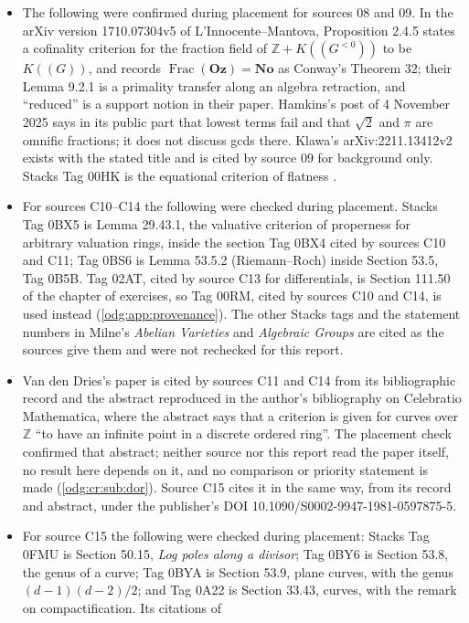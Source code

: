 \documentclass[11pt,oneside]{article}
\numberwithin{equation}{section}
\theoremstyle{definition}
\theoremstyle{remark}
\newcommand{\No}{\mathbf{No}}
\newcommand{\Oz}{\mathbf{Oz}}
\newcommand{\Z}{\mathbb Z}
\newcommand{\Frac}{\operatorname{Frac}}
\begin{document}
\begin{itemize}[leftmargin=*]
\item The following were confirmed during placement for sources 08 and 09. In
the arXiv version 1710.07304v5 of L'Innocente--Mantova, Proposition 2.4.5
states a
cofinality criterion for the fraction field of $\Z+K((G^{<0}))$ to be
$K((G))$, and records $\Frac(\Oz)=\No$ as Conway's Theorem 32; their Lemma
9.2.1 is a primality
transfer along an algebra retraction, and ``reduced'' is a support notion in
their paper. Hamkins's post of 4 November 2025 \cite{Hamkins} says in its
public part that lowest terms fail and that $\sqrt2$ and $\pi$ are omnific
fractions; it does not discuss gcds there. Klawa's arXiv:2211.13412v2
\cite{Klawa} exists with the stated title and is cited by source 09 for
background only. Stacks Tag 00HK is the equational criterion of flatness
\cite{StacksFlat}.
\item For sources C10--C14 the following were checked during placement. Stacks Tag
0BX5 is Lemma 29.43.1, the valuative criterion of properness for arbitrary valuation
rings, inside the section Tag 0BX4 cited by sources C10 and C11; Tag 0BS6 is Lemma
53.5.2 (Riemann--Roch) inside Section 53.5, Tag 0B5B. Tag 02AT, cited by source C13
for differentials, is Section 111.50 of the chapter of exercises, so Tag 00RM,
cited by sources C10 and C14, is used instead (\cref{odg:app:provenance}). The other
Stacks tags and the statement numbers in Milne's \emph{Abelian Varieties} and
\emph{Algebraic Groups} are cited as the sources give them and were not rechecked for
this report.
\item Van den Dries's paper \cite{vdDries} is cited by sources C11 and C14 from its
bibliographic record and the abstract reproduced in the author's bibliography on
Celebratio Mathematica, where the abstract says that a criterion is given for curves
over $\Z$ ``to have an infinite point in a discrete ordered ring''. The placement check
confirmed that abstract; neither source nor this report read the paper itself, no
result here depends on it, and no comparison or priority statement is made
(\cref{odg:cr:sub:dor}). Source C15 cites it in the same way, from its record and
abstract, under the publisher's DOI 10.1090/S0002-9947-1981-0597875-5.
\item For source C15 the following were checked during placement: Stacks Tag 0FMU is
Section 50.15, \emph{Log poles along a divisor}; Tag 0BY6 is Section 53.8, the genus of a
curve; Tag 0BYA is Section 53.9, plane curves, with the genus $(d-1)(d-2)/2$; and Tag
0A22 is Section 33.43, curves, with the remark on compactification. Its citations of

\end{itemize}
\end{document}
